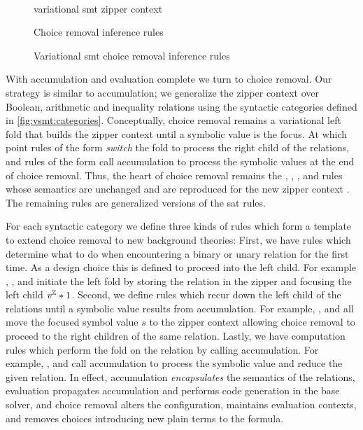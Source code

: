 ~\label{section:vsmt:choice-removal}
% 
\begin{figure}
  
  \caption{variational \ac{smt} zipper context}
  \label{fig:vsmt:zipper}
\end{figure}
%
\begin{figure}
  
  \caption{Choice removal inference rules}%
  \label{fig:vsmt:inf:chc}
\end{figure}
% 
\begin{figure}
  \ContinuedFloat
  
  \caption{Variational \ac{smt} choice removal inference rules}
  \label{fig:vsmt:zipper}
\end{figure}
%
With accumulation and evaluation complete we turn to choice removal.
%
Our strategy is similar to accumulation; we generalize the zipper context over
Boolean, arithmetic and inequality relations using the syntactic categories
defined in \autoref{fig:vsmt:categories}.
%
Conceptually, choice removal remains a variational left fold that builds the
zipper context until a symbolic value is the focus. At which point rules of the
form  \emph{switch} the fold to process the right child of the
relations, and rules of the form  call accumulation to process the
symbolic values at the end of choice removal. Thus, the heart of choice removal
remains the \crEval, \crChc, \crChcT, and \crChcF rules whose semantics are
unchanged and are reproduced for the new zipper context \zipper. The remaining
rules are generalized versions of the \ac{sat} rules. 

For each syntactic category we define three kinds of rules which form a template
to extend choice removal to new background theories: First, we have rules which
determine what to do when encountering a binary or unary relation for the first
time. As a design choice this is defined to proceed into the left child. For
example \crNot{}, \crBool{}, and \crInEq{} initiate the left fold by storing the
relation in the zipper and focusing the left child $\mathit{v^{\mathbb{Z}}}*{1}$.
%
Second, we define rules which recur down the left child of the relations until a
symbolic value results from accumulation. For example, \crInEqL{}, \crBoolL{}
and \crArithL{} all move the focused symbol value $s$ to the zipper context
allowing choice removal to proceed to the right children of the same relation.
%
Lastly, we have computation rules which perform the fold on the relation by
calling accumulation. For example, \crUnaryIn, \crArithR and \crInEqR call
accumulation to process the symbolic value and reduce the given relation. In
effect, accumulation \emph{encapsulates} the semantics of the relations,
evaluation propagates accumulation and performs code generation in the base
solver, and choice removal alters the configuration, maintains evaluation
contexts, and removes choices introducing new plain terms to the formula.

